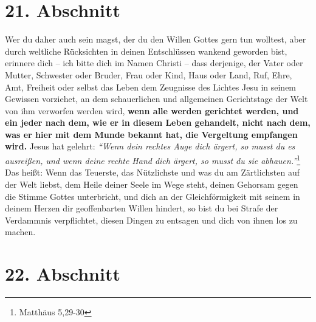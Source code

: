 \section{21. Abschnitt} \label{kap4_ab21}

Wer du daher auch sein magst, der du den Willen Gottes gern tun wolltest, aber
durch weltliche Rücksichten in deinen Entschlüssen wankend geworden bist,
erinnere dich -- ich bitte dich im Namen Christi -- dass derjenige, der Vater
oder
Mutter, Schwester oder Bruder, Frau oder Kind, Haus oder Land, Ruf, Ehre, Amt,
Freiheit oder selbst das Leben dem Zeugnisse des Lichtes Jesu 
in seinem
Gewissen vorziehet, an dem schauerlichen und allgemeinen Gerichtstage
 der Welt \label{ref:04_21_gericht}
von ihm verworfen werden wird, \textbf{wenn alle werden gerichtet werden, und
ein jeder
nach dem, wie er in diesem Leben gehandelt, nicht nach dem, was er hier mit dem
Munde bekannt  hat, die Vergeltung empfangen wird.} Jesus hat
gelehrt:
\textit{"`Wenn
dein rechtes Auge dich ärgert, so musst du es ausreißen, und wenn deine rechte
Hand dich ärgert, so musst du sie abhauen."'}\footnote{Matthäus  5,29-30}
Das heißt:
Wenn das Teuerste, das Nützlichste und was du am Zärtlichsten auf der Welt
liebst, dem Heile deiner Seele im Wege steht, deinen Gehorsam gegen die Stimme
Gottes unterbricht, und dich an der Gleichförmigkeit mit seinem in deinem Herzen
dir geoffenbarten Willen hindert, so bist du bei Strafe der Verdammnis
verpflichtet, diesen Dingen zu entsagen und dich von ihnen los zu machen.

\section{22. Abschnitt} \label{kap4_ab22}

